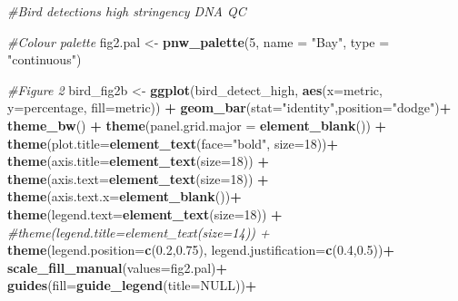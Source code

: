 \documentclass[]{article}
\newenvironment{Shaded}{\begin{snugshade}}{\end{snugshade}}
\newcommand{\KeywordTok}[1]{\textcolor[rgb]{0.13,0.29,0.53}{\textbf{#1}}}
\newcommand{\DataTypeTok}[1]{\textcolor[rgb]{0.13,0.29,0.53}{#1}}
\newcommand{\DecValTok}[1]{\textcolor[rgb]{0.00,0.00,0.81}{#1}}
\newcommand{\FloatTok}[1]{\textcolor[rgb]{0.00,0.00,0.81}{#1}}
\newcommand{\StringTok}[1]{\textcolor[rgb]{0.31,0.60,0.02}{#1}}
\newcommand{\CommentTok}[1]{\textcolor[rgb]{0.56,0.35,0.01}{\textit{#1}}}
\newcommand{\OtherTok}[1]{\textcolor[rgb]{0.56,0.35,0.01}{#1}}
\newcommand{\OperatorTok}[1]{\textcolor[rgb]{0.81,0.36,0.00}{\textbf{#1}}}
\newcommand{\NormalTok}[1]{#1}
\begin{document}
\begin{Shaded}
\begin{Highlighting}[]
\CommentTok{#Bird detections high stringency DNA QC}

\CommentTok{#Colour palette}
\NormalTok{fig2.pal <-}\StringTok{ }\KeywordTok{pnw_palette}\NormalTok{(}\DecValTok{5}\NormalTok{, }\DataTypeTok{name =} \StringTok{"Bay"}\NormalTok{, }\DataTypeTok{type =} \StringTok{"continuous"}\NormalTok{)}

\CommentTok{#Figure 2}
\NormalTok{bird_fig2b <-}\StringTok{ }\KeywordTok{ggplot}\NormalTok{(bird_detect_high, }\KeywordTok{aes}\NormalTok{(}\DataTypeTok{x=}\NormalTok{metric, }\DataTypeTok{y=}\NormalTok{percentage, }\DataTypeTok{fill=}\NormalTok{metric)) }\OperatorTok{+}
\StringTok{  }\KeywordTok{geom_bar}\NormalTok{(}\DataTypeTok{stat=}\StringTok{"identity"}\NormalTok{,}\DataTypeTok{position=}\StringTok{"dodge"}\NormalTok{)}\OperatorTok{+}
\StringTok{  }\KeywordTok{theme_bw}\NormalTok{() }\OperatorTok{+}\StringTok{ }\KeywordTok{theme}\NormalTok{(}\DataTypeTok{panel.grid.major =} \KeywordTok{element_blank}\NormalTok{()) }\OperatorTok{+}
\StringTok{  }\KeywordTok{theme}\NormalTok{(}\DataTypeTok{plot.title=}\KeywordTok{element_text}\NormalTok{(}\DataTypeTok{face=}\StringTok{"bold"}\NormalTok{, }\DataTypeTok{size=}\DecValTok{18}\NormalTok{))}\OperatorTok{+}
\StringTok{  }\KeywordTok{theme}\NormalTok{(}\DataTypeTok{axis.title=}\KeywordTok{element_text}\NormalTok{(}\DataTypeTok{size=}\DecValTok{18}\NormalTok{)) }\OperatorTok{+}\StringTok{ }\KeywordTok{theme}\NormalTok{(}\DataTypeTok{axis.text=}\KeywordTok{element_text}\NormalTok{(}\DataTypeTok{size=}\DecValTok{18}\NormalTok{)) }\OperatorTok{+}
\StringTok{  }\KeywordTok{theme}\NormalTok{(}\DataTypeTok{axis.text.x=}\KeywordTok{element_blank}\NormalTok{())}\OperatorTok{+}
\StringTok{  }\KeywordTok{theme}\NormalTok{(}\DataTypeTok{legend.text=}\KeywordTok{element_text}\NormalTok{(}\DataTypeTok{size=}\DecValTok{18}\NormalTok{)) }\OperatorTok{+}\StringTok{ }\CommentTok{#theme(legend.title=element_text(size=14)) +}
\StringTok{  }\KeywordTok{theme}\NormalTok{(}\DataTypeTok{legend.position=}\KeywordTok{c}\NormalTok{(}\FloatTok{0.2}\NormalTok{,}\FloatTok{0.75}\NormalTok{), }\DataTypeTok{legend.justification=}\KeywordTok{c}\NormalTok{(}\FloatTok{0.4}\NormalTok{,}\FloatTok{0.5}\NormalTok{))}\OperatorTok{+}
\StringTok{  }\KeywordTok{scale_fill_manual}\NormalTok{(}\DataTypeTok{values=}\NormalTok{fig2.pal)}\OperatorTok{+}
\StringTok{  }\KeywordTok{guides}\NormalTok{(}\DataTypeTok{fill=}\KeywordTok{guide_legend}\NormalTok{(}\DataTypeTok{title=}\OtherTok{NULL}\NormalTok{))}\OperatorTok{+}

\end{Highlighting}
\end{Shaded}
\end{document}
